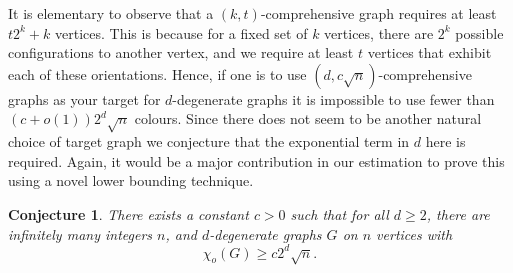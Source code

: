 \documentclass[11pt]{article}
\newtheorem{conjecture}[theorem]{Conjecture}
\theoremstyle{definition}
\begin{document}
It is elementary to observe that a $(k,t)$-comprehensive graph requires at least $t2^k+k$ vertices.
This is because for a fixed set of $k$ vertices, there are $2^k$ possible configurations to another vertex,
and we require at least $t$ vertices that exhibit each of these orientations.
Hence, if one is to use $(d,c\sqrt{n})$-comprehensive graphs as your target for $d$-degenerate graphs
it is impossible to use fewer than $(c+o(1))2^d \sqrt{n}$ colours.
Since there does not seem to be another natural choice of target graph
we conjecture that the exponential term in $d$ here is required.
Again, it would be a major contribution in our estimation 
to prove this using a novel lower bounding technique.


\begin{conjecture}
    There exists a constant $c>0$ such that for all $d\geq 2$,
    there are infinitely many integers $n$, and $d$-degenerate graphs $G$ on $n$ vertices
    with 
    \[
    \chi_o(G) \geq c 2^{d}\sqrt{n}.
    \]
\end{conjecture}




\end{document}

